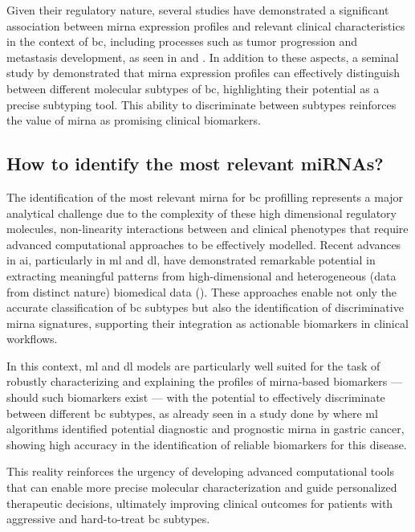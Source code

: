 Given their regulatory nature, several studies have demonstrated a significant
association between \gls{mirna} expression profiles and relevant clinical
characteristics in the context of \gls{bc}, including processes such as tumor
progression and metastasis development, as seen in
\textcite{_Mendes2022Nanodelivery} \textcite{mirna_as_biomarkers_Ho2022} and
\textcite{mirnas_in_bc_Muñoz2023}. In addition to these aspects, a seminal
study by \textcite{mirna_as_bio_for_sub_Blenkiron2007MicroRNA} demonstrated
that \gls{mirna} expression profiles can effectively distinguish between
different molecular subtypes of \gls{bc}, highlighting their potential as a
precise subtyping tool. This ability to discriminate between subtypes
reinforces the value of \gls{mirna} as promising clinical biomarkers.

\subsection{How to identify the most relevant miRNAs?}

The identification of the most relevant \gls{mirna} for \gls{bc} profilling
represents a major analytical challenge due to the complexity of these high
dimensional regulatory molecules, non-linearity interactions between and
clinical phenotypes that require advanced computational approaches to be
effectively modelled. Recent advances in \gls{ai}, particularly in \gls{ml} and
\gls{dl}, have demonstrated remarkable potential in extracting meaningful
patterns from high-dimensional and heterogeneous (data from distinct nature)
biomedical data (\textcite{ml_for_microRNA_Luo2023MachineLearning}). These
approaches enable not only the accurate classification of \gls{bc} subtypes but
also the identification of discriminative \gls{mirna} signatures, supporting
their integration as actionable biomarkers in clinical workflows.

In this context, \gls{ml} and \gls{dl} models are particularly well suited for
the task of robustly characterizing and explaining the profiles of
\gls{mirna}-based biomarkers — should such biomarkers exist — with the
potential to effectively discriminate between different \gls{bc} subtypes, as
already seen in a study done by \textcite{ml_gastric_Azari2023} where \gls{ml}
algorithms identified potential diagnostic and prognostic \gls{mirna} in
gastric cancer, showing high accuracy in the identification of reliable
biomarkers for this disease.

This reality reinforces the urgency of developing advanced computational tools
that can enable more precise molecular characterization and guide personalized
therapeutic decisions, ultimately improving clinical outcomes for patients with
aggressive and hard-to-treat \gls{bc} subtypes.

